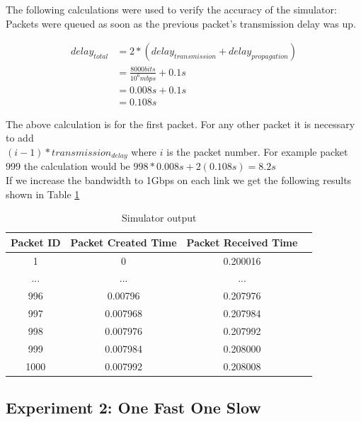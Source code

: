 \documentclass[fleqn,11pt]{article}
\begin{document}
\noindent
The following calculations were used to verify the accuracy of the simulator:\\

Packets were queued as soon as the previous packet's transmission delay was up.

\begin{align*}
  delay_{total} &= 2 * (delay_{transmission} + delay_{propagation})\\
  &= \frac{8000bits}{10^6mbps} + 0.1s\\
  &= 0.008s + 0.1s\\
  &= 0.108s
\end{align*}

\noindent
The above calculation is for the first packet. For any other packet it is
necessary to add \\ $(i - 1) * transmission_{delay}$ where $i$ is the packet
number. For example packet 999 the calculation would be $998 * 0.008s +
2(0.108s) = 8.2s$ \\

If we increase the bandwidth to 1Gbps on each link we get the following results
shown in Table \ref{tab:three_node_1_b}

\begin{table}[h]
  \caption{Simulator output}
  \label{tab:three_node_1_b}
  \begin{center}
    \begin{tabular}{cccc}
      \toprule
      Packet ID & Packet Created Time & Packet Received Time & \\
      \midrule
      1 & 0 & 0.200016\\
      ... & ... & ...\\
      996 & 0.00796 & 0.207976\\
      997 & 0.007968 & 0.207984\\
      998 & 0.007976 & 0.207992\\
      999 & 0.007984 & 0.208000\\
      1000 & 0.007992 & 0.208008\\
      \bottomrule
    \end{tabular}
  \end{center}
\end{table}
\vspace{0.5cm}

\pagebreak


\subsection{Experiment 2: One Fast One Slow}
\vspace{0.5cm}
\end{document}
